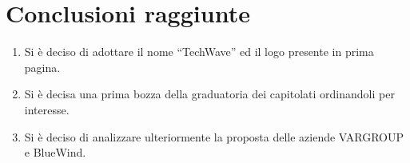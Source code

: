 \documentclass{TWReport}
\begin{document}
\section*{Conclusioni raggiunte}
\begin{enumerate}
    \item Si è deciso di adottare il nome “TechWave” ed il logo presente in prima pagina.
    \item Si è decisa una prima bozza della graduatoria dei capitolati ordinandoli per interesse.
    \item Si è deciso di analizzare ulteriormente la proposta delle aziende VARGROUP e BlueWind.
\end{enumerate}
\end{document}
